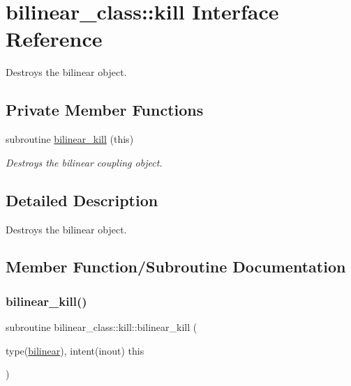 \hypertarget{interfacebilinear__class_1_1kill}{}\section{bilinear\+\_\+class\+:\+:kill Interface Reference}
\label{interfacebilinear__class_1_1kill}


Destroys the bilinear object.  


\subsection*{Private Member Functions}
\begin{DoxyCompactItemize}
\item 
subroutine \hyperlink{interfacebilinear__class_1_1kill_a13e3f18d8ff47a1f92f87642f8c9f734}{bilinear\+\_\+kill} (this)
\begin{DoxyCompactList}\small\item\em Destroys the bilinear coupling object. \end{DoxyCompactList}\end{DoxyCompactItemize}


\subsection{Detailed Description}
Destroys the bilinear object. 

\subsection{Member Function/\+Subroutine Documentation}
\mbox{\label{interfacebilinear__class_1_1kill_a13e3f18d8ff47a1f92f87642f8c9f734}} 
\subsubsection{\texorpdfstring{bilinear\+\_\+kill()}{bilinear\_kill()}}
{\footnotesize\ttfamily subroutine bilinear\+\_\+class\+::kill\+::bilinear\+\_\+kill (\begin{DoxyParamCaption}\item[{type(\hyperlink{structbilinear__class_1_1bilinear}{bilinear}), intent(inout)}]{this }\end{DoxyParamCaption})\hspace{0.3cm}{\ttfamily [private]}}



